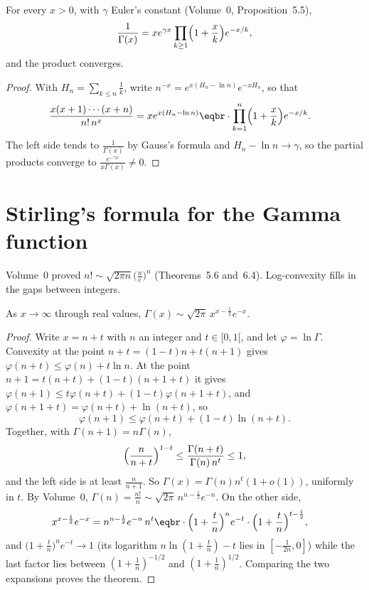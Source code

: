 \begin{corollary}\label{cor:weierstrass}
For every $x>0$, with $\gamma$ Euler's constant (Volume~0, Proposition~5.5),
\[
\frac1{\Gamma(x)}=xe^{\gamma x}\prod_{k\ge1}\Bigl(1+\frac xk\Bigr)e^{-x/k},
\]
and the product converges.
\end{corollary}
\begin{proof}
With $H_n=\sum_{k\le n}\frac1k$, write $n^{-x}=e^{x(H_n-\ln n)}e^{-xH_n}$, so that
\[
\begin{aligned}\frac{x(x+1)\cdots(x+n)}{n!\,n^x}&=xe^{x(H_n-\ln n)}\eqbr\cdot\prod_{k=1}^n\Bigl(1+\frac xk\Bigr)e^{-x/k}.\end{aligned}
\]
The left side tends to $\frac1{\Gamma(x)}$ by Gauss's formula and $H_n-\ln n\to\gamma$, so the partial products converge to
$\frac{e^{-\gamma x}}{x\Gamma(x)}\ne0$.
\end{proof}

\section{Stirling's formula for the Gamma function}

Volume~0 proved $n!\sim\sqrt{2\pi n}\bigl(\frac ne\bigr)^n$ (Theorems~5.6 and~6.4). Log-convexity fills in the gaps between
integers.

\begin{theorem}\label{thm:stirlinggamma}
As $x\to\infty$ through real values, $\Gamma(x)\sim\sqrt{2\pi}\,x^{x-\frac12}e^{-x}$.
\end{theorem}
\begin{proof}
Write $x=n+t$ with $n$ an integer and $t\in[0,1[$, and let $\varphi=\ln\Gamma$. Convexity at the point $n+t=(1-t)n+t(n+1)$ gives
$\varphi(n+t)\le\varphi(n)+t\ln n$. At the point $n+1=t(n+t)+(1-t)(n+1+t)$ it gives
$\varphi(n+1)\le t\varphi(n+t)+(1-t)\varphi(n+1+t)$, and $\varphi(n+1+t)=\varphi(n+t)+\ln(n+t)$, so
\[
\varphi(n+1)\le\varphi(n+t)+(1-t)\ln(n+t).
\]
Together, with $\Gamma(n+1)=n\Gamma(n)$,
\[
\Bigl(\frac n{n+t}\Bigr)^{1-t}\le\frac{\Gamma(n+t)}{\Gamma(n)\,n^t}\le1,
\]
and the left side is at least $\frac n{n+1}$. So $\Gamma(x)=\Gamma(n)n^t(1+o(1))$, uniformly in $t$. By Volume~0,
$\Gamma(n)=\frac{n!}n\sim\sqrt{2\pi}\,n^{n-\frac12}e^{-n}$. On the other side,
\[
\begin{aligned}x^{x-\frac12}e^{-x}&=n^{n-\frac12}e^{-n}\,n^t\eqbr\cdot\Bigl(1+\frac tn\Bigr)^n e^{-t}\cdot\Bigl(1+\frac tn\Bigr)^{t-\frac12},\end{aligned}
\]
and $\bigl(1+\frac tn\bigr)^ne^{-t}\to1$ (its logarithm $n\ln(1+\frac tn)-t$ lies in $[-\frac1{2n},0]$) while the last factor lies between
$(1+\frac1n)^{-1/2}$ and $(1+\frac1n)^{1/2}$. Comparing the two expansions proves the theorem.
\end{proof}

